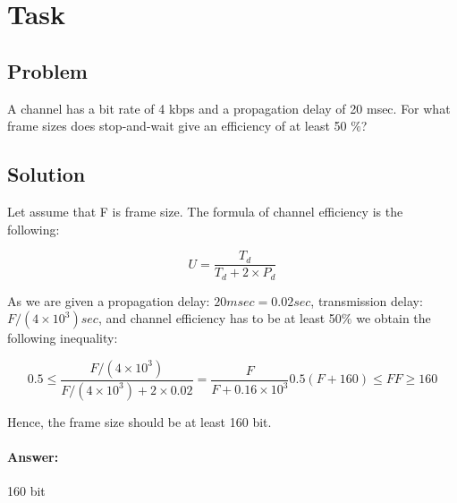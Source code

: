 \documentclass[12pt]{article}
\begin{document}
    \section{Task}\label{sec:task-2}

    \subsection{Problem}
        A channel has a bit rate of 4 kbps and a propagation delay of 20 msec.
        For what frame sizes does stop-and-wait give an efficiency of at least 50 $\%$?

        \subsection{Solution}
        Let assume that F is frame size.
        The formula of channel efficiency is the following:

        \begin{equation}
            U = \frac{T_d}{T_d + 2 \times P_d}
        \end{equation}

        As we are given a propagation delay: $20 msec = 0.02sec$, transmission delay: $F/(4\times10^3)sec$,
        and channel efficiency has to be at least 50$\%$ we obtain the following inequality:

        \begin{subequations}
            \begin{equation}
                0.5 \leq \frac{F/(4\times10^3)}{F/(4\times10^3) + 2 \times 0.02} = \frac{F}{F + 0.16 \times 10^3}
            \end{equation}

            \begin{equation}
                0.5(F + 160) \leq F
            \end{equation}

            \begin{equation}
                F \geq 160
            \end{equation}
        \end{subequations}

        Hence, the frame size should be at least 160 bit.

        \paragraph{Answer:} 160 bit
    \newpage
\end{document}
